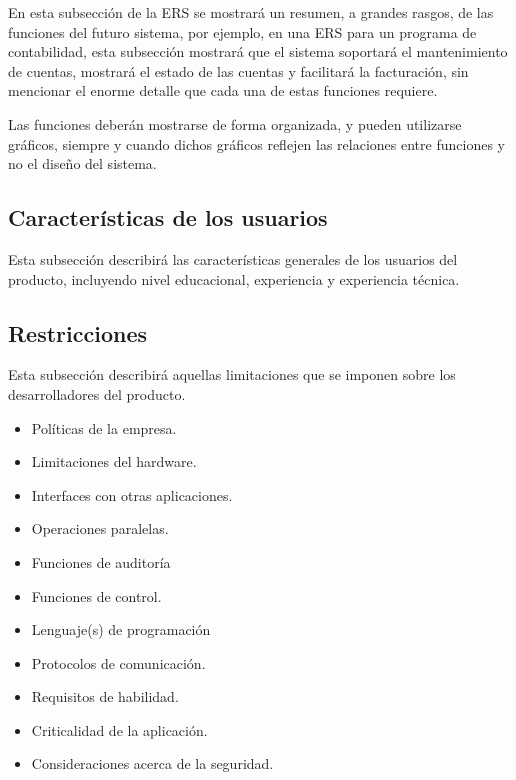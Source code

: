 \documentclass[12pt,a4paper, twosite]{article}
\begin{document}
En esta subsección de la ERS se mostrará un resumen, a grandes
rasgos, de las funciones del futuro sistema, por ejemplo, en una ERS
para un programa de contabilidad, esta subsección mostrará que el
sistema soportará el mantenimiento de cuentas, mostrará el estado de
las cuentas y facilitará la facturación, sin mencionar el enorme
detalle que cada una de estas funciones requiere.

Las funciones deberán mostrarse de forma organizada, y pueden
utilizarse gráficos, siempre y cuando dichos gráficos reflejen las
relaciones entre funciones y no el diseño del sistema.


\subsection{Características de los usuarios}
\label{sec:orga40b0ee}

Esta subsección describirá las características generales de los
usuarios del producto, incluyendo nivel educacional, experiencia y
experiencia técnica.


\subsection{Restricciones}
\label{sec:org5ca5790}

Esta subsección describirá aquellas limitaciones que se imponen
sobre los desarrolladores del producto.

\begin{itemize}
\item Políticas de la empresa.

\item Limitaciones del hardware.

\item Interfaces con otras aplicaciones.

\item Operaciones paralelas.

\item Funciones de auditoría

\item Funciones de control.

\item Lenguaje(s) de programación

\item Protocolos de comunicación.

\item Requisitos de habilidad.

\item Criticalidad de la aplicación.

\item Consideraciones acerca de la seguridad.
\end{itemize}
\end{document}
